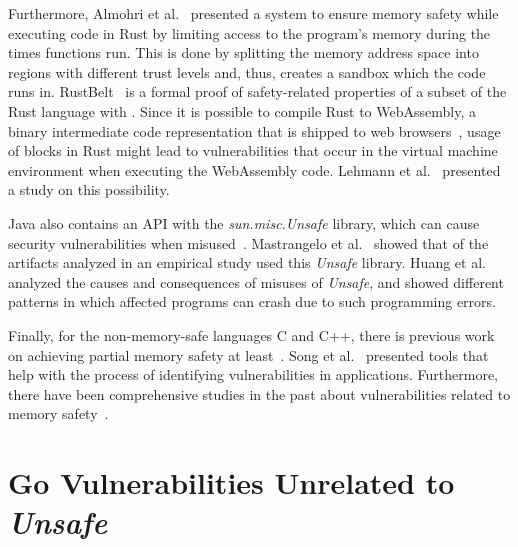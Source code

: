 Furthermore, Almohri et al.~\cite{almohri2018} presented a system to ensure memory safety while executing \unsafe{} code
in Rust by limiting access to the program's memory during the times \unsafe{} functions run.
This is done by splitting the memory address space into regions with different trust levels and, thus, creates a sandbox
which the \unsafe{} code runs in.
RustBelt~\cite{jung2017} is a formal proof of safety-related properties of a subset of the Rust language with \unsafe{}.
Since it is possible to compile Rust to WebAssembly, a binary intermediate code representation that is shipped to web
browsers~\cite{rourke2018}, usage of \unsafe{} blocks in Rust might lead to vulnerabilities that occur in the virtual
machine environment when executing the WebAssembly code.
Lehmann et al.~\cite{lehmann2020} presented a study on this possibility.

Java also contains an \unsafe{} API with the \textit{sun.misc.Unsafe} library, which can cause security vulnerabilities
when misused~\cite{mastrangelo2019}.
Mastrangelo et al.~\cite{mastrangelo2015} showed that  of the artifacts analyzed in an empirical study
used this \textit{Unsafe} library.
Huang et al.~\cite{huang2019} analyzed the causes and consequences of misuses of \textit{Unsafe}, and showed different
patterns in which affected programs can crash due to such programming errors.

Finally, for the non-memory-safe languages C and C++, there is previous work on achieving partial memory safety at
least~\cite{burow2018, nagarakatte2009}.
Song et al.~\cite{song2019} presented tools that help with the process of identifying vulnerabilities in applications.
Furthermore, there have been comprehensive studies in the past about vulnerabilities related to memory
safety~\cite{szekeres2013,alnaeli2017,larochelle2001}.



\section{Go Vulnerabilities Unrelated to \textit{Unsafe}}\label{sec:related-work:other-go-vulnerabilities}

